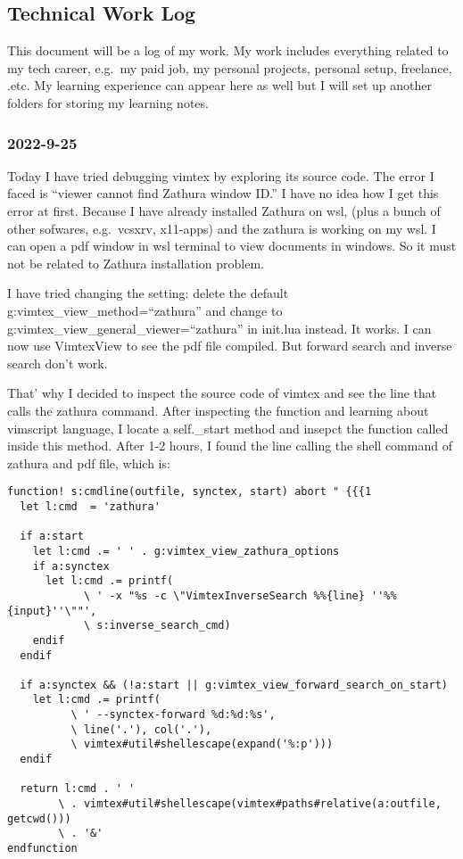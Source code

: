 \hypertarget{technical-work-log}{%
\subsection{Technical Work Log}\label{technical-work-log}}

This document will be a log of my work. My work includes everything
related to my tech career, e.g.~my paid job, my personal projects,
personal setup, freelance, .etc. My learning experience can appear here
as well but I will set up another folders for storing my learning notes.

\hypertarget{section}{%
\subsubsection{2022-9-25}\label{section}}

Today I have tried debugging vimtex by exploring its source code. The
error I faced is ``viewer cannot find Zathura window ID.'' I have no
idea how I get this error at first. Because I have already installed
Zathura on wsl, (plus a bunch of other sofwares, e.g.~vcsxrv, x11-apps)
and the zathura is working on my wsl. I can open a pdf window in wsl
terminal to view documents in windows. So it must not be related to
Zathura installation problem.

I have tried changing the setting: delete the default
g:vimtex\_view\_method=``zathura'' and change to
g:vimtex\_view\_general\_viewer=``zathura'' in init.lua instead. It
works. I can now use VimtexView to see the pdf file compiled. But
forward search and inverse search don't work.

That' why I decided to inspect the source code of vimtex and see the
line that calls the zathura command. After inspecting the function and
learning about vimscript language, I locate a self.\_start method and
insepct the function called inside this method. After 1-2 hours, I found
the line calling the shell command of zathura and pdf file, which is:

\begin{verbatim}
function! s:cmdline(outfile, synctex, start) abort " {{{1
  let l:cmd  = 'zathura'

  if a:start
    let l:cmd .= ' ' . g:vimtex_view_zathura_options
    if a:synctex
      let l:cmd .= printf(
            \ ' -x "%s -c \"VimtexInverseSearch %%{line} ''%%{input}''\""',
            \ s:inverse_search_cmd)
    endif
  endif

  if a:synctex && (!a:start || g:vimtex_view_forward_search_on_start)
    let l:cmd .= printf(
          \ ' --synctex-forward %d:%d:%s',
          \ line('.'), col('.'),
          \ vimtex#util#shellescape(expand('%:p')))
  endif

  return l:cmd . ' '
        \ . vimtex#util#shellescape(vimtex#paths#relative(a:outfile, getcwd()))
        \ . '&'
endfunction 
\end{verbatim}

